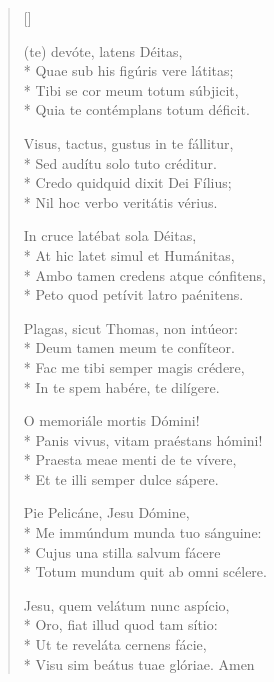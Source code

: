 \newHymn
{}

\begin{verse}[\versewidth]

 (te) devóte, latens Déitas,\\*
     Quae sub his figúris vere látitas;  \\*  
     Tibi se cor meum totum súbjicit,     \\*
    Quia te contémplans totum déficit.    
    \pointtrans

   Visus, tactus, gustus in te fállitur,  \\*
      Sed audítu solo tuto créditur.      \\*
     Credo quidquid dixit Dei Fílius;     \\*
      Nil hoc verbo veritátis vérius.     

       In cruce latébat sola Déitas,      \\*
     At hic latet simul et Humánitas,     \\*
    Ambo tamen credens atque cónfitens,   \\*
     Peto quod petívit latro paénitens.    

    Plagas, sicut Thomas, non intúeor:    \\*
       Deum tamen meum te confíteor.      \\*
     Fac me tibi semper magis crédere,    \\*
     In te spem habére, te dilígere.      

        O memoriále mortis Dómini!\\*
    Panis vivus, vitam praéstans hómini!\\*
      Praesta meae menti de te vívere,     \\* 
      Et te illi semper dulce sápere.     

        Pie Pelicáne, Jesu Dómine,\\*
      Me immúndum munda tuo sánguine:\\*
      Cujus una stilla salvum fácere   \\*   
    Totum mundum quit ab omni scélere.    

     Jesu, quem velátum nunc aspício,\\*
      Oro, fiat illud quod tam sítio:  \\*   
       Ut te reveláta cernens fácie,     \\* 
     Visu sim beátus tuae glóriae. Amen     
\end{verse}

